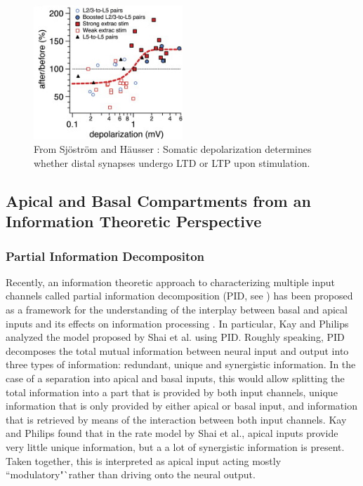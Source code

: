 \documentclass[10pt,a4paper,draft]{article}
\begin{document}
\begin{figure}
\centering
\includegraphics[width=0.5\textwidth]{./figures/sjoestroem_haeusser_plast_switch.jpg}
\caption{From Sjöström and Häusser \cite{Sjoestroem_2006}: Somatic depolarization determines whether distal synapses undergo LTD or LTP upon stimulation.}
\label{fig:ltp_switch}
\end{figure}

\subsection{Apical and Basal Compartments from an Information Theoretic Perspective}
\subsubsection{Partial Information Decompositon}
Recently, an information theoretic approach to characterizing multiple input channels called partial information decomposition (PID, see \cite{Williams_2010}) has been proposed as a framework for the understanding of the interplay between basal and apical inputs and its effects on information processing \cite{Wibral_2017}. In particular, Kay and Philips \cite{Kay_2019} analyzed the model proposed by Shai et al. \cite{Shai_2015} using PID. Roughly speaking, PID decomposes the total mutual information between neural input and output into three types of information: redundant, unique and synergistic information. In the case of a separation into apical and basal inputs, this would allow splitting the total information into a part that is provided by both input channels, unique information that is only provided by either apical or basal input, and information that is retrieved by means of the interaction between both input channels. Kay and Philips found that in the rate model by Shai et al., apical inputs provide very little unique information, but a a lot of synergistic information is present. Taken together, this is interpreted as apical input acting mostly ``modulatory"`rather than driving onto the neural output.
\end{document}
